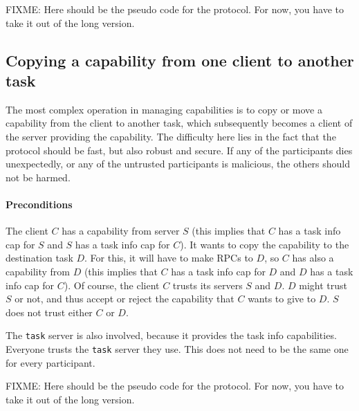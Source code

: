 FIXME: Here should be the pseudo code for the protocol.  For now, you
have to take it out of the long version.

\begin{comment}
  The main point of this section is to point out that only one task
  info capability is required to protect all capabilities provided to
  a single task.  The protocols described here always assume that no
  task info caps are held by anyone (except those mentioned in the
  preconditions).  In reality, sometimes the required task info caps
  will already be held.
\end{comment}


\subsection{Copying a capability from one client to another task}

The most complex operation in managing capabilities is to copy or move
a capability from the client to another task, which subsequently
becomes a client of the server providing the capability.  The
difficulty here lies in the fact that the protocol should be fast, but
also robust and secure.  If any of the participants dies unexpectedly,
or any of the untrusted participants is malicious, the others should
not be harmed.

\paragraph{Preconditions}
The client $C$ has a capability from server $S$ (this implies that $C$
has a task info cap for $S$ and $S$ has a task info cap for $C$).  It
wants to copy the capability to the destination task $D$.  For this,
it will have to make RPCs to $D$, so $C$ has also a capability from
$D$ (this implies that $C$ has a task info cap for $D$ and $D$ has a
task info cap for $C$).  Of course, the client $C$ trusts its servers
$S$ and $D$.  $D$ might trust $S$ or not, and thus accept or reject
the capability that $C$ wants to give to $D$.  $S$ does not trust
either $C$ or $D$.
  
The \texttt{task} server is also involved, because it provides the
task info capabilities.  Everyone trusts the \texttt{task} server they
use.  This does not need to be the same one for every participant.

FIXME: Here should be the pseudo code for the protocol.  For now, you
have to take it out of the long version.

